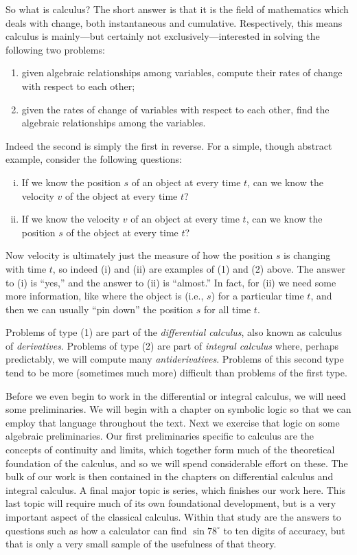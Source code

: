 So what is calculus?  The short answer is that it is 
the field of mathematics which deals with change,
both instantaneous and cumulative.  Respectively,
this means calculus is mainly---but certainly not exclusively---interested 
in solving the following two problems:
\begin{enumerate}[(1)]
\item given algebraic relationships among variables, compute 
      their rates of change with respect to each other;
\item given the rates of change of variables with respect to
      each other, find the algebraic relationships
      among the variables.
\end{enumerate}
Indeed the second is simply the first in reverse.  For a simple,
though abstract example, consider the following questions:
\begin{enumerate}[(i)]
\item If we know the position $s$ of an object at every time $t$,
      can we know the velocity $v$ of the object at every time $t$?
\item If we know the velocity $v$ of an object at every time $t$,
      can we know the position $s$ of the object at every time $t$?
\end{enumerate}
Now velocity is ultimately
just the measure of how the position $s$ is changing with  time $t$,
so indeed (i) and (ii) are examples of (1) and (2) above.
The answer to (i) is ``yes,'' and the answer to (ii) is ``almost.''
In fact, for (ii) we need some more information, like 
where the object is (i.e., $s$) for a particular time $t$,
and then we can usually ``pin down'' the position $s$ for all time $t$.  

Problems of type (1) are part of the {\it differential calculus},
also known as calculus of {\it derivatives}.  Problems of type
(2) are part of {\it integral calculus} where, perhaps
predictably, we will compute many {\it antiderivatives}.
Problems of this second type tend to be more (sometimes much more)
difficult than problems of the first type.

Before we even begin to work in the differential or integral calculus, we
will need some preliminaries.  We will begin with a 
chapter on symbolic logic so that we can employ that language throughout
the text.  Next we exercise that logic on some algebraic preliminaries.
Our first preliminaries specific to calculus are the concepts
of continuity
and limits, which together form much of the
theoretical foundation of the calculus, and so we will spend
considerable effort on these.  The bulk of our
work is then contained in the
chapters on differential calculus and integral calculus.
A final major topic is series, which finishes our work here.
This last topic will require much of its own foundational 
development, but is a very important aspect of the classical
calculus.  Within that study are the answers to questions
such as how a calculator can find $\sin78^\circ$ to ten digits
of accuracy, but that is only a very small sample of the usefulness
of that theory.


